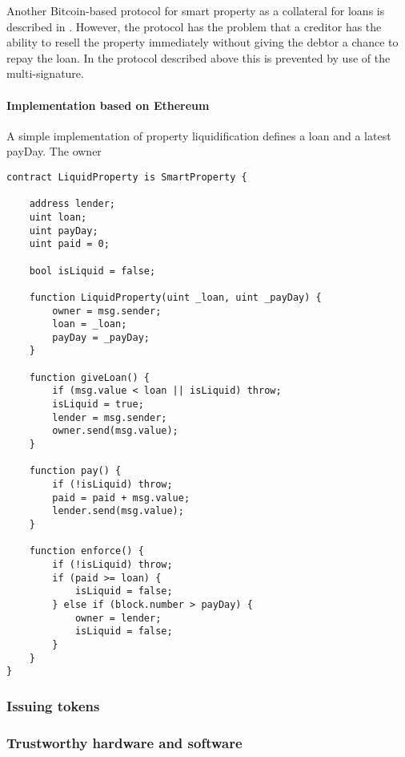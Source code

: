 Another Bitcoin-based protocol for smart property as a collateral for loans is described in \cite{smartproperty2011}. However, the protocol has the problem that a creditor has the ability to resell the property immediately without giving the debtor a chance to repay the loan. In the protocol described above this is prevented by use of the multi-signature. 

\paragraph{Implementation based on Ethereum}

A simple implementation of property liquidification defines a loan and a latest payDay. The owner  

\begin{lstlisting}[breaklines,basicstyle=\tiny]
contract LiquidProperty is SmartProperty {
    
    address lender;
    uint loan;
    uint payDay;
    uint paid = 0;
    
    bool isLiquid = false;
    
    function LiquidProperty(uint _loan, uint _payDay) {
        owner = msg.sender;
        loan = _loan;
        payDay = _payDay;
    }
    
    function giveLoan() {
        if (msg.value < loan || isLiquid) throw;
        isLiquid = true;
        lender = msg.sender;
        owner.send(msg.value);
    }
    
    function pay() {
        if (!isLiquid) throw;
        paid = paid + msg.value;
        lender.send(msg.value);
    }
    
    function enforce() {
        if (!isLiquid) throw;
        if (paid >= loan) {
            isLiquid = false;
        } else if (block.number > payDay) {
            owner = lender;
            isLiquid = false;
        }
    }
}
\end{lstlisting}

\subsubsection{Issuing tokens}





\subsubsection{Trustworthy hardware and software}

